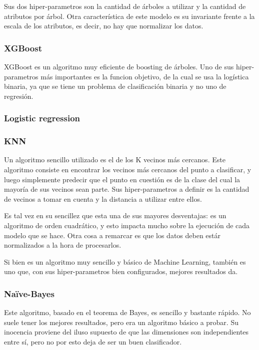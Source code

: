 \documentclass[a4paper]{article}
\begin{document}
Sus dos hiper-parametros son la cantidad de árboles a utilizar y la cantidad de atributos por árbol. Otra característica de este modelo es su invariante frente a la escala de los atributos, es decir, no hay que normalizar los datos.

\subsubsection{XGBoost}

XGBoost es un algoritmo muy eficiente de boosting de árboles. Uno de sus hiper-parametros más importantes es la funcion objetivo, de la cual se usa la logística binaria, ya que se tiene un problema de clasificación binaria y no uno de regresión. 

\subsubsection{Logistic regression}

\subsubsection{KNN}

Un algoritmo sencillo utilizado es el de los K vecinos más cercanos. Este algoritmo consiste en encontrar los vecinos más cercanos del punto a clasificar, y luego simplemente predecir que el punto en cuestión es de la clase del cual la mayoría de sus vecinos sean parte. Sus hiper-parametros a definir es la cantidad de vecinos a tomar en cuenta y la distancia a utilizar entre ellos. 

Es tal vez en su sencillez que esta una de sus mayores desventajas: es un algoritmo de orden cuadrático, y esto impacta mucho sobre la ejecución de cada modelo que se hace. Otra cosa a remarcar es que los datos deben estár normalizados a la hora de procesarlos.

Si bien es un algoritmo muy sencillo y básico de Machine Learning, también es uno que, con sus hiper-parametros bien configurados, mejores resultados da. 

\subsubsection{Naïve-Bayes}

Este algoritmo, basado en el teorema de Bayes, es sencillo y bastante rápido. No suele tener los mejores resultados, pero era un algoritmo básico a probar. Su inocencia proviene del iluso supuesto de que las dimensiones son independientes entre sí, pero no por esto deja de ser un buen clasificador.
\end{document}

